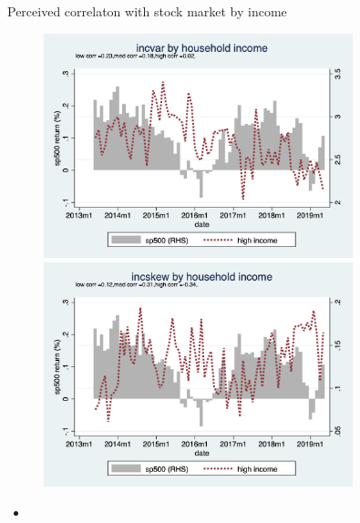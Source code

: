 \documentclass{beamer}
\begin{document}
\begin{frame}{Perceived correlaton with stock market by income}
	\begin{figure}
		\centering
		\label{ts_stk_hhinc}
		\includegraphics[width=0.8\textwidth, height=\0.4\textheight]{figures/ts_incvar_HHinc_g_mean_stk} \\
		\includegraphics[width=0.8\textwidth, height=\0.4\textheight]{figures/ts_incskew_HHinc_g_mean_stk} 
	\end{figure}
	\begin{itemize}
		\item 
	\end{itemize}
\end{frame}
\end{document}
